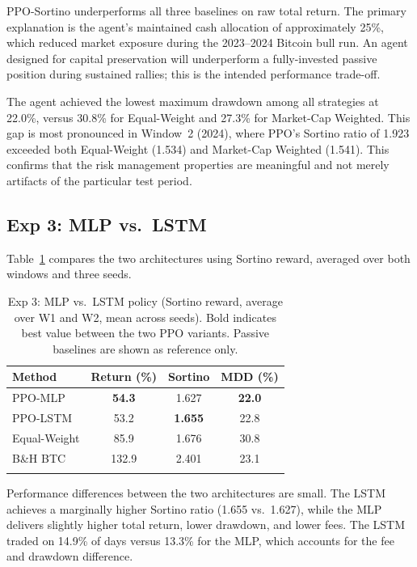 \documentclass[pdflatex,sn-mathphys-num]{sn-jnl}
\begin{document}
PPO-Sortino underperforms all three baselines on raw total return. The primary
explanation is the agent's maintained cash allocation of approximately 25\%,
which reduced market exposure during the 2023--2024 Bitcoin bull run. An agent
designed for capital preservation will underperform a fully-invested passive
position during sustained rallies; this is the intended performance trade-off.

The agent achieved the lowest maximum drawdown among all strategies at 22.0\%,
versus 30.8\% for Equal-Weight and 27.3\% for Market-Cap Weighted. This gap is
most pronounced in Window~2 (2024), where PPO's Sortino ratio of 1.923 exceeded
both Equal-Weight (1.534) and Market-Cap Weighted (1.541). This confirms that
the risk management properties are meaningful and not merely artifacts of the
particular test period.

\subsection{Exp 3: MLP vs.\ LSTM}

Table~\ref{tab:exp3} compares the two architectures using Sortino reward,
averaged over both windows and three seeds.

\begin{table}[h]
\caption{Exp 3: MLP vs.\ LSTM policy (Sortino reward, average over W1 and W2,
mean across seeds). Bold indicates best value between the two PPO variants.
Passive baselines are shown as reference only.}\label{tab:exp3}
\begin{tabular*}{\textwidth}{@{\extracolsep\fill}lccc}
\toprule
Method & Return (\%) & Sortino & MDD (\%) \\
\midrule
PPO-MLP      & \textbf{54.3} & 1.627 & \textbf{22.0} \\
PPO-LSTM     & 53.2 & \textbf{1.655} & 22.8 \\
Equal-Weight & 85.9 & 1.676 & 30.8 \\
B\&H BTC     & 132.9 & 2.401 & 23.1 \\
\botrule
\end{tabular*}
\end{table}

Performance differences between the two architectures are small. The LSTM
achieves a marginally higher Sortino ratio (1.655 vs.\ 1.627), while the MLP
delivers slightly higher total return, lower drawdown, and lower fees. The LSTM
traded on 14.9\% of days versus 13.3\% for the MLP, which accounts for the
fee and drawdown difference.
\end{document}

